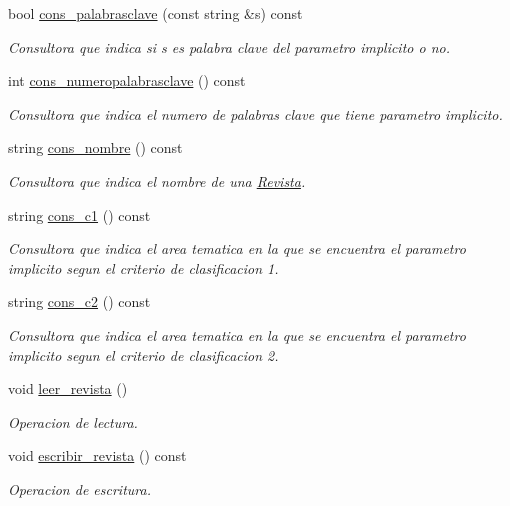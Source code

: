 \begin{DoxyCompactItemize}
bool \hyperlink{class_revista_aad8d277011c68f7acdeac6f3d47d28cb}{cons\-\_\-palabrasclave} (const string \&s) const 
\begin{DoxyCompactList}\small\item\em Consultora que indica si s es palabra clave del parametro implicito o no. \end{DoxyCompactList}\item 
int \hyperlink{class_revista_a69d99a64d3ef987db733b4f492c53db8}{cons\-\_\-numeropalabrasclave} () const 
\begin{DoxyCompactList}\small\item\em Consultora que indica el numero de palabras clave que tiene parametro implicito. \end{DoxyCompactList}\item 
string \hyperlink{class_revista_a2739f78a2d67490287421da71b5ea2f6}{cons\-\_\-nombre} () const 
\begin{DoxyCompactList}\small\item\em Consultora que indica el nombre de una \hyperlink{class_revista}{Revista}. \end{DoxyCompactList}\item 
string \hyperlink{class_revista_ae069d5a6c3e1c7996388505b4fde5a53}{cons\-\_\-c1} () const 
\begin{DoxyCompactList}\small\item\em Consultora que indica el area tematica en la que se encuentra el parametro implicito segun el criterio de clasificacion 1. \end{DoxyCompactList}\item 
string \hyperlink{class_revista_a56072f31d4ee209c961cf3495a6a0687}{cons\-\_\-c2} () const 
\begin{DoxyCompactList}\small\item\em Consultora que indica el area tematica en la que se encuentra el parametro implicito segun el criterio de clasificacion 2. \end{DoxyCompactList}\item 
void \hyperlink{class_revista_a61178cb7b236db9a3354d5d00df1b31b}{leer\-\_\-revista} ()
\begin{DoxyCompactList}\small\item\em Operacion de lectura. \end{DoxyCompactList}\item 
void \hyperlink{class_revista_a22abd6f25251e007e5e08bfd11d060a0}{escribir\-\_\-revista} () const 
\begin{DoxyCompactList}\small\item\em Operacion de escritura. \end{DoxyCompactList}\end{DoxyCompactItemize}
